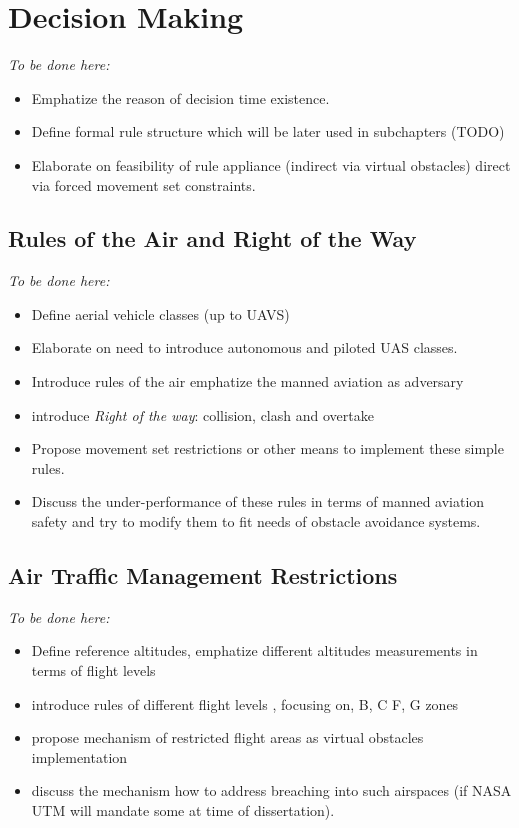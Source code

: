\section{Decision Making}\label{s:Decision making}
    \emph{To be done here:}
    \begin{itemize}
        \item Emphatize the reason of decision time existence.
        \item Define formal rule structure which will be later used in subchapters (TODO)
        \item Elaborate on feasibility of rule appliance (indirect via virtual obstacles) direct via forced movement set constraints.
    \end{itemize}

\subsection{Rules of the Air and Right of the Way}\label{s:RulesofTheAir}
    \emph{To be done here:}
    \begin{itemize}
        \item Define aerial vehicle classes (up to UAVS)
        \item Elaborate on need to introduce autonomous and piloted UAS classes.
        \item Introduce rules of the air emphatize the manned aviation as adversary
        \item introduce \emph{Right of the way}: collision, clash and overtake
        \item Propose movement set restrictions or other means to implement these simple rules.
        \item Discuss the under-performance of these rules in terms of manned aviation safety and try to modify them to fit needs of obstacle avoidance systems.
    \end{itemize}
    
\subsection{Air Traffic Management Restrictions}\label{s:AirTrafficManagementRestrictions}
    \emph{To be done here:}
    \begin{itemize}
        \item Define reference altitudes, emphatize different altitudes measurements in terms of flight levels
        \item introduce rules of different flight levels , focusing on, B, C F, G zones 
        \item propose mechanism of restricted flight areas as virtual obstacles implementation
        \item discuss the mechanism how to address breaching into such airspaces (if NASA UTM will mandate some at time of dissertation).
    \end{itemize}
    
